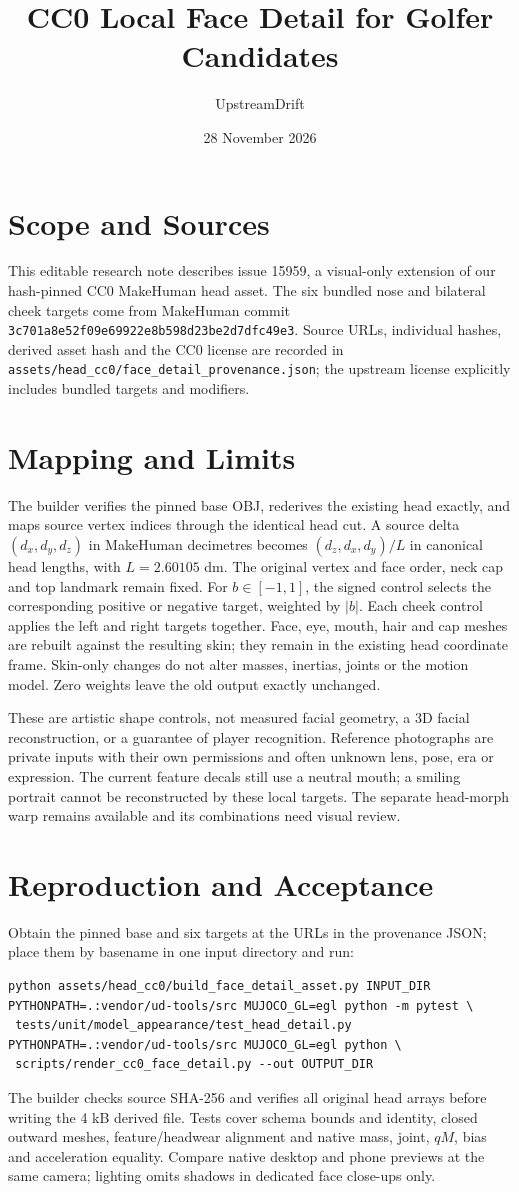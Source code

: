 \documentclass{article}
\title{CC0 Local Face Detail for Golfer Candidates}
\author{UpstreamDrift}
\date{28 November 2026}
\begin{document}
\maketitle
\section{Scope and Sources}
This editable research note describes issue 15959, a visual-only extension of
our hash-pinned CC0 MakeHuman head asset. The six bundled nose and bilateral
cheek targets come from MakeHuman commit
\texttt{3c701a8e52f09e69922e8b598d23be2d7dfc49e3}. Source URLs, individual
hashes, derived asset hash and the CC0 license are recorded in
\texttt{assets/head\_cc0/face\_detail\_provenance.json}; the upstream license
explicitly includes bundled targets and modifiers.
\section{Mapping and Limits}
The builder verifies the pinned base OBJ, rederives the existing head exactly,
and maps source vertex indices through the identical head cut. A source delta
$(d_x,d_y,d_z)$ in MakeHuman decimetres becomes $(d_z,d_x,d_y)/L$ in canonical
head lengths, with $L=2.60105$ dm. The original vertex and face order, neck cap
and top landmark remain fixed. For $b\in[-1,1]$, the signed control selects
the corresponding positive or negative target, weighted by $|b|$. Each cheek
control applies the left and right targets together. Face, eye, mouth, hair and
cap meshes are rebuilt against the resulting skin; they remain in the existing
head coordinate frame. Skin-only changes do not alter masses, inertias, joints
or the motion model. Zero weights leave the old output exactly unchanged.
\par
These are artistic shape controls, not measured facial geometry, a 3D facial
reconstruction, or a guarantee of player recognition. Reference photographs
are private inputs with their own permissions and often unknown lens, pose,
era or expression. The current feature decals still use a neutral mouth; a
smiling portrait cannot be reconstructed by these local targets. The separate
head-morph warp remains available and its combinations need visual review.
\section{Reproduction and Acceptance}
Obtain the pinned base and six targets at the URLs in the provenance JSON;
place them by basename in one input directory and run:
\begin{verbatim}
python assets/head_cc0/build_face_detail_asset.py INPUT_DIR
PYTHONPATH=.:vendor/ud-tools/src MUJOCO_GL=egl python -m pytest \
 tests/unit/model_appearance/test_head_detail.py
PYTHONPATH=.:vendor/ud-tools/src MUJOCO_GL=egl python \
 scripts/render_cc0_face_detail.py --out OUTPUT_DIR
\end{verbatim}
The builder checks source SHA-256 and verifies all original head arrays before
writing the 4 kB derived file. Tests cover schema bounds and identity, closed
outward meshes, feature/headwear alignment and native mass, joint, $qM$, bias
and acceleration equality. Compare native desktop and phone previews at the
same camera; lighting omits shadows in dedicated face close-ups only.
\end{document}
